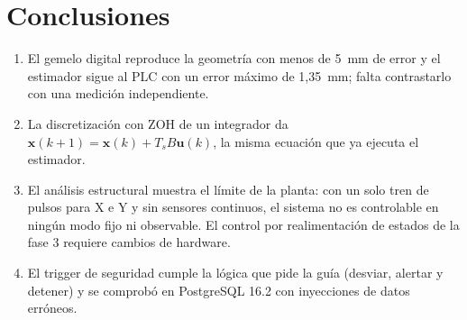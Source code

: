 \documentclass[a4paper,11pt]{article}
\begin{document}
\section{Conclusiones}
\begin{enumerate}
\item El gemelo digital reproduce la geometría con menos de 5~mm de error y el estimador sigue al PLC con un error máximo de 1,35~mm; falta contrastarlo con una medición independiente.
\item La discretización con ZOH de un integrador da $\mathbf{x}(k+1) = \mathbf{x}(k) + T_sB\mathbf{u}(k)$, la misma ecuación que ya ejecuta el estimador.
\item El análisis estructural muestra el límite de la planta: con un solo tren de pulsos para X e Y y sin sensores continuos, el sistema no es controlable en ningún modo fijo ni observable. El control por realimentación de estados de la fase 3 requiere cambios de hardware.
\item El trigger de seguridad cumple la lógica que pide la guía (desviar, alertar y detener) y se comprobó en PostgreSQL 16.2 con inyecciones de datos erróneos.
\end{enumerate}
\end{document}
